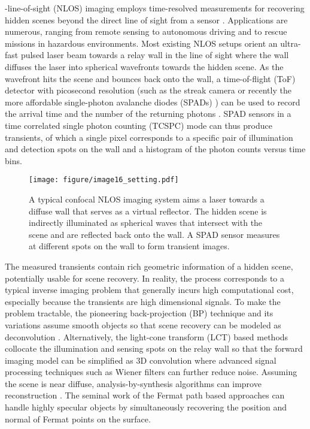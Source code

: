 \documentclass[10pt,journal,compsoc]{IEEEtran}
\begin{document}
-line-of-sight (NLOS) imaging employs time-resolved measurements for recovering hidden scenes beyond the direct line of sight from a sensor \cite{2017Jarabo, 2020Faccio}. Applications are numerous, ranging from remote sensing to autonomous driving and to rescue missions in hazardous environments. Most existing NLOS setups orient an ultra-fast pulsed laser beam towards a relay wall in the line of sight where the wall diffuses the laser into spherical wavefronts towards the hidden scene. As the wavefront hits the scene and bounces back onto the wall, a time-of-flight (ToF) detector with picosecond resolution (such as the streak camera \cite{2012Velten, 2012Gupta, 2013Velten} or recently the more affordable single-photon avalanche diodes (SPADs) \cite{2015Mauro, 2017Tsai, 2018Xu, 2019FK, 2019Xin, 2018LCT}) can be used to record the arrival time and the number of the returning photons \cite{2015Gariepy, 2016Shin, 2017Matthew}. SPAD sensors in a time correlated single photon counting (TCSPC) mode can thus produce transients, of which a single pixel corresponds to a specific pair of illumination and detection spots on the wall and a histogram of the photon counts versus time bins. 

\begin{figure}[!t]
\centering
\texttt{[image: figure/image16\_setting.pdf]}
\caption{A typical confocal NLOS imaging system aims a laser towards a diffuse wall that serves as a virtual reflector. The hidden scene is indirectly illuminated as
spherical waves that intersect with the scene and are reflected back onto the wall. A SPAD sensor measures at different spots on the wall to form transient images.}
\label{SystemSetting}
\end{figure}

The measured transients contain rich geometric information of a hidden scene, potentially usable for scene recovery. In reality, the process corresponds to a typical inverse imaging problem that generally incurs high computational cost, especially because the transients are high dimensional signals. To make the problem tractable, the pioneering back-projection (BP) technique and its variations assume smooth objects so that scene recovery can be modeled as deconvolution \cite{2012Velten, 2012Gupta, 2015Mauro, 2017Victor}. Alternatively, the light-cone transform (LCT) based methods collocate the illumination and sensing spots on the relay wall so that the forward imaging model can be simplified as 3D convolution \cite{2018LCT, 2019FK, 2020DLCT, 2020Mariko} where advanced signal processing techniques such as Wiener filters \cite{2018LCT, 2019Ahn, 2020DLCT} can further reduce noise. Assuming the scene is near diffuse, analysis-by-synthesis algorithms can improve reconstruction \cite{2019Tsai, 2020ToG}. The seminal work of the Fermat path based approaches \cite{2017Tsai, 2019Xin} can handle highly specular objects by simultaneously recovering the position and normal of Fermat points on the surface.  
\end{document}
